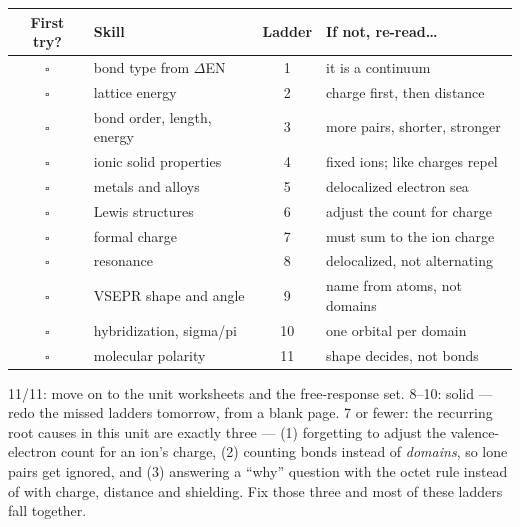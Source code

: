 \documentclass{apchem-worksheet}
\begin{document}
\renewcommand{\arraystretch}{1.35}
\noindent\begin{tabular}{@{}c p{6.2cm} c >{\raggedright\arraybackslash}p{4.8cm}@{}}
\toprule
\textbf{First try?} & \textbf{Skill} & \textbf{Ladder} &
  \textbf{If not, re-read\ldots}\\
\midrule
$\square$ & bond type from $\Delta$EN & 1 & it is a continuum \\
$\square$ & lattice energy & 2 & charge first, then distance \\
$\square$ & bond order, length, energy & 3 & more pairs, shorter, stronger \\
$\square$ & ionic solid properties & 4 & fixed ions; like charges repel \\
$\square$ & metals and alloys & 5 & delocalized electron sea \\
$\square$ & Lewis structures & 6 & adjust the count for charge \\
$\square$ & formal charge & 7 & must sum to the ion charge \\
$\square$ & resonance & 8 & delocalized, not alternating \\
$\square$ & VSEPR shape and angle & 9 & name from atoms, not domains \\
$\square$ & hybridization, sigma/pi & 10 & one orbital per domain \\
$\square$ & molecular polarity & 11 & shape decides, not bonds \\
\bottomrule
\end{tabular}

\begin{apcnote}
11/11: move on to the unit worksheets and the free-response set.
8--10: solid --- redo the missed ladders tomorrow, from a blank page.
7 or fewer: the recurring root causes in this unit are exactly three ---
(1) forgetting to adjust the valence-electron count for an ion's charge,
(2) counting bonds instead of \emph{domains}, so lone pairs get ignored,
and (3) answering a ``why'' question with the octet rule instead of with
charge, distance and shielding. Fix those three and most of these ladders
fall together.
\end{apcnote}
\end{document}
